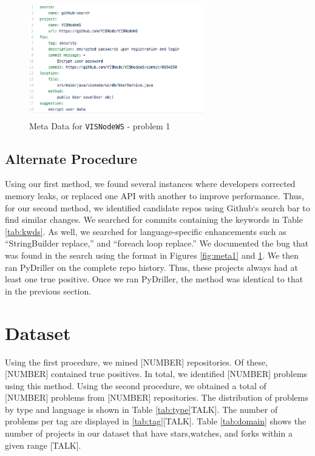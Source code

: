 \documentclass[sigconf]{acmart}
\begin{document}
\begin{figure}
\includegraphics[height=2in, width=3in]{YAMLmetadata2}
\caption{Meta Data for \texttt{VISNodeWS} - problem 1}
\label{fig:meta2}
\end{figure}

\subsection{Alternate Procedure}
Using our first method, we found several instances where developers corrected memory leaks, or replaced one API with another to improve performance. Thus, for our second method, we identified candidate repos using Github`s search bar to find similar changes. We searched for commits containing the keywords in Table \ref{tab:kwds}. As well, we searched for language-specific enhancements such as ``StringBuilder replace,'' and ``foreach loop replace.'' We documented the bug that was found in the search using the format in Figures \ref{fig:meta1} and \ref{fig:meta2}. We then ran PyDriller on the complete repo history. Thus, these projects always had at least one true positive. Once we ran PyDriller, the method was identical to that in the previous section.

\section{Dataset}


Using the first procedure, we mined [NUMBER] repositories. Of these, [NUMBER] contained true positives. In total, we identified [NUMBER]  problems using this method. Using the second procedure, we obtained a total of [NUMBER] problems from [NUMBER] repositories. The distribution of problems by type and language is shown in Table \ref{tab:type}TALK]. The number of problems per tag are displayed in \ref{tab:tag}[TALK]. Table \ref{tab:domain} shows the number of projects in our dataset that have stars,watches, and forks within a given range	[TALK].
\end{document}
